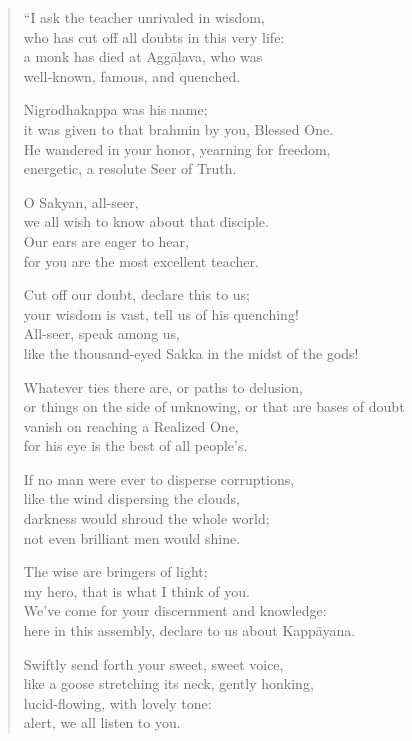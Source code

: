 \documentclass[12pt,openany]{book}%
\begin{document}
\begin{verse}%
“I ask the teacher unrivaled in wisdom, \\
who has cut off all doubts in this very life: \\
a monk has died at \textsanskrit{Aggāḷava}, who was \\
well-known, famous, and quenched. 

Nigrodhakappa was his name; \\
it was given to that brahmin by you, Blessed One. \\
He wandered in your honor, yearning for freedom, \\
energetic, a resolute Seer of Truth. 

O Sakyan, all-seer, \\
we all wish to know about that disciple. \\
Our ears are eager to hear, \\
for you are the most excellent teacher. 

Cut off our doubt, declare this to us; \\
your wisdom is vast, tell us of his quenching! \\
All-seer, speak among us, \\
like the thousand-eyed Sakka in the midst of the gods! 

Whatever ties there are, or paths to delusion, \\
or things on the side of unknowing, or that are bases of doubt \\
vanish on reaching a Realized One, \\
for his eye is the best of all people’s. 

If no man were ever to disperse corruptions, \\
like the wind dispersing the clouds, \\
darkness would shroud the whole world; \\
not even brilliant men would shine. 

The wise are bringers of light; \\
my hero, that is what I think of you. \\
We’ve come for your discernment and knowledge: \\
here in this assembly, declare to us about \textsanskrit{Kappāyana}. 

Swiftly send forth your sweet, sweet voice, \\
like a goose stretching its neck, gently honking, \\
lucid-flowing, with lovely tone: \\
alert, we all listen to you. 


\end{verse}
\end{document}
